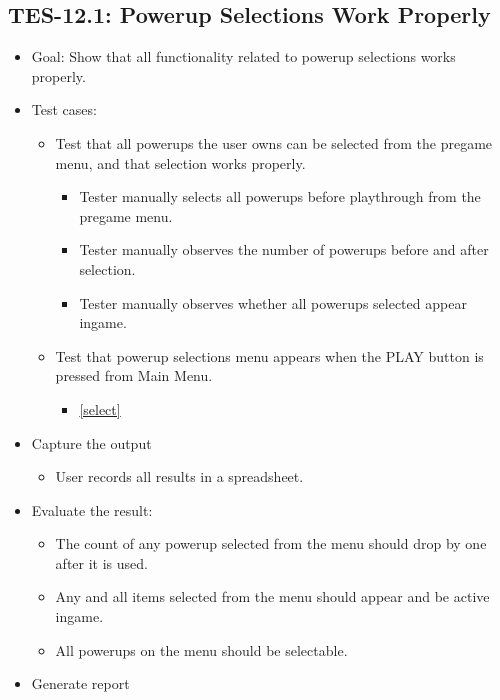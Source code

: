 \subsection{TES-12.1: Powerup Selections Work Properly }
\label{powerups}
\begin{itemize}
\item Goal: Show that all functionality related to powerup selections works properly. 
\item Test cases: 

\begin{itemize}
\item Test that all powerups the user owns can be selected from the pregame menu, and that selection works properly.
\begin{itemize}
\item Tester manually selects all powerups before playthrough from the pregame menu.
\item Tester manually observes the number of powerups before and after selection.
\item Tester manually observes whether all powerups selected appear ingame.
\end{itemize}
\item Test that powerup selections menu appears when the PLAY button is pressed from Main Menu.
\begin{itemize}
\item \ref{select}
\end{itemize}
\end{itemize}
\item Capture the output 
\begin{itemize}
\item User records all results in a spreadsheet.
\end{itemize}
\item Evaluate the result: 

\begin{itemize}
\item The count of any powerup selected from the menu should drop by one after it is used.
\item Any and all items selected from the menu should appear and be active ingame.
\item All powerups on the menu should be selectable.
\end{itemize}
\item Generate report 
\end{itemize}

